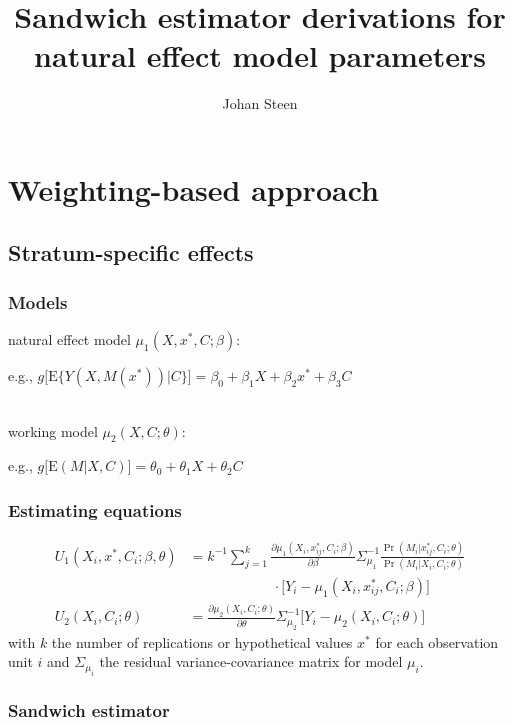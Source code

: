 \documentclass[]{article}
\title{Sandwich estimator derivations for natural effect model parameters}
\author{Johan Steen}
\begin{document}
\maketitle

\section*{Weighting-based approach}
     
\subsection*{Stratum-specific effects}

\subsubsection*{Models}
natural effect model $\mu_1(X,x^*,C;\beta)$:
\begin{flushright} e.g., $g\big[\textrm{E}\{Y(X,M(x^*))\vert C\}\big] = \beta_0 + \beta_1 X + \beta_2 x^* + \beta_3 C$\end{flushright}\\[1em]
working model $\mu_2(X,C;\theta)$:
\begin{flushright} e.g., $g\big[\textrm{E}(M\vert X,C)\big] = \theta_0 + \theta_1 X + \theta_2 C$\end{flushright}

\subsubsection*{Estimating equations}
\begin{align*}
\displaystyle U_{1}(X_i,x^*,C_i;\beta,\theta) &= k^{-1} \sum_{j=1}^{k} \frac{\partial \mu_1(X_i,x^*_{ij},C_i;\beta)}{\partial \beta} \Sigma_{\mu_1}^{-1} \frac{\Pr(M_i\vert x^*_{ij},C_i;\theta)}{\Pr(M_i\vert X_i,C_i;\theta)}\\[-0.6em] & \qquad \qquad \qquad \cdot \big[ Y_i - \mu_1(X_i,x^*_{ij},C_i;\beta) \big]\\[1em]
\displaystyle U_{2}(X_i,C_i;\theta) &= \frac{\partial \mu_2(X_i,C_i;\theta)}{\partial \theta} \Sigma_{\mu_2}^{-1} \big[ Y_i - \mu_2(X_i,C_i;\theta) \big]
\end{align*}
with $k$ the number of replications or hypothetical values $x^*$ for each observation unit $i$ and $\Sigma_{\mu_i}$ the residual variance-covariance matrix for model $\mu_i$.

\subsubsection*{Sandwich estimator}
\end{document}
